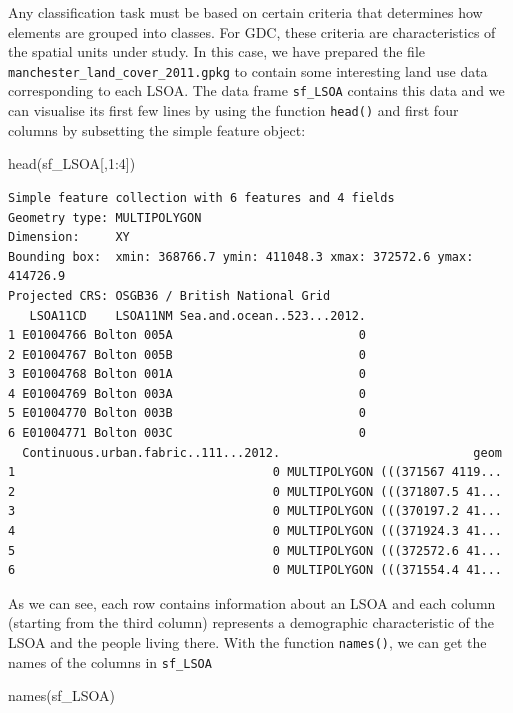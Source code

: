 \documentclass[
  letterpaper,
  DIV=11,
  numbers=noendperiod]{scrreprt}
\newenvironment{Shaded}{\begin{snugshade}}{\end{snugshade}}
\newcommand{\DecValTok}[1]{\textcolor[rgb]{0.68,0.00,0.00}{#1}}
\newcommand{\FunctionTok}[1]{\textcolor[rgb]{0.28,0.35,0.67}{#1}}
\newcommand{\NormalTok}[1]{\textcolor[rgb]{0.00,0.23,0.31}{#1}}
\newcommand{\SpecialCharTok}[1]{\textcolor[rgb]{0.37,0.37,0.37}{#1}}
\begin{document}
Any classification task must be based on certain criteria that
determines how elements are grouped into classes. For GDC, these
criteria are characteristics of the spatial units under study. In this
case, we have prepared the file
\texttt{manchester\_land\_cover\_2011.gpkg} to contain some interesting
land use data corresponding to each LSOA. The data frame
\texttt{sf\_LSOA} contains this data and we can visualise its first few
lines by using the function \texttt{head()} and first four columns by
subsetting the simple feature object:

\begin{Shaded}
\begin{Highlighting}[]
\FunctionTok{head}\NormalTok{(sf\_LSOA[,}\DecValTok{1}\SpecialCharTok{:}\DecValTok{4}\NormalTok{])}
\end{Highlighting}
\end{Shaded}

\begin{verbatim}
Simple feature collection with 6 features and 4 fields
Geometry type: MULTIPOLYGON
Dimension:     XY
Bounding box:  xmin: 368766.7 ymin: 411048.3 xmax: 372572.6 ymax: 414726.9
Projected CRS: OSGB36 / British National Grid
   LSOA11CD    LSOA11NM Sea.and.ocean..523...2012.
1 E01004766 Bolton 005A                          0
2 E01004767 Bolton 005B                          0
3 E01004768 Bolton 001A                          0
4 E01004769 Bolton 003A                          0
5 E01004770 Bolton 003B                          0
6 E01004771 Bolton 003C                          0
  Continuous.urban.fabric..111...2012.                           geom
1                                    0 MULTIPOLYGON (((371567 4119...
2                                    0 MULTIPOLYGON (((371807.5 41...
3                                    0 MULTIPOLYGON (((370197.2 41...
4                                    0 MULTIPOLYGON (((371924.3 41...
5                                    0 MULTIPOLYGON (((372572.6 41...
6                                    0 MULTIPOLYGON (((371554.4 41...
\end{verbatim}

As we can see, each row contains information about an LSOA and each
column (starting from the third column) represents a demographic
characteristic of the LSOA and the people living there. With the
function \texttt{names()}, we can get the names of the columns in
\texttt{sf\_LSOA}

\begin{Shaded}
\begin{Highlighting}[]
\FunctionTok{names}\NormalTok{(sf\_LSOA)}
\end{Highlighting}
\end{Shaded}
\end{document}
